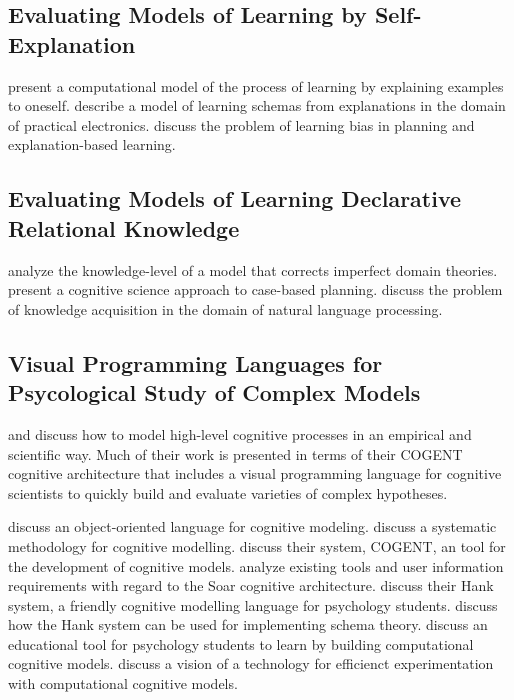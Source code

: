 \subsection{Evaluating Models of Learning by Self-Explanation}
\cite{vanlehn:1993} present a computational model of the process of learning by explaining examples to oneself.
\cite{kieras:1993} describe a model of learning schemas from explanations in the domain of practical electronics.
\cite{rosenbloom:1993} discuss the problem of learning bias in planning and explanation-based learning.

\subsection{Evaluating Models of Learning Declarative Relational Knowledge}
\cite{huffman:1993} analyze the knowledge-level of a model that corrects imperfect domain theories.
\cite{hammond:1993} present a cognitive science approach to case-based planning.
\cite{wilensky:1993} discuss the problem of knowledge acquisition in the domain of natural language processing.

\subsection{Visual Programming Languages for Psycological Study of Complex Models}

\cite{cooper:2002} and \cite{cooper:1998a} discuss how to model high-level cognitive processes in an empirical and scientific way.
Much of their work is presented in terms of their COGENT cognitive architecture that includes a visual programming language for cognitive scientists to quickly build and evaluate varieties of complex hypotheses.

\cite{cooper:1995} discuss an object-oriented language for cognitive modeling.
\cite{cooper:1996} discuss a systematic methodology for cognitive modelling.
\cite{cooper:1998b} discuss their system, COGENT, an tool for the development of cognitive models.
\cite{councill:2003} analyze existing tools and user information requirements with regard to the Soar cognitive architecture.
\cite{mulholland:1998} discuss their Hank system, a friendly cognitive modelling language for psychology students.
\cite{mulholland:1999} discuss how the Hank system can be used for implementing schema theory.
\cite{mulholland:2000} discuss an educational tool for psychology students to learn by building computational cognitive models.
\cite{yule:2001} discuss a vision of a technology for efficienct experimentation with computational cognitive models.

